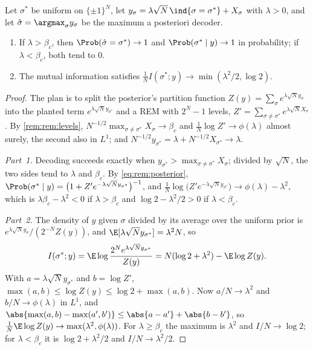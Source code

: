 \begin{refsection}
\begin{corollary}\label{cor:rem:decoding}
Let $\sigma^*$ be uniform on $\{\pm1\}^N$, let $y_\sigma=\lambda\sqrt N\,\ind\{\sigma=\sigma^*\}+X_\sigma$ with $\lambda>0$, and let $\hat\sigma=\argmax_\sigma y_\sigma$ be the maximum a posteriori decoder.
\begin{enumerate}
\item If $\lambda>\beta_c$, then $\Prob(\hat\sigma=\sigma^*)\to1$ and $\Prob(\sigma^*\mid y)\to1$ in probability; if $\lambda<\beta_c$, both tend to $0$.
\item The mutual information satisfies $\frac1N I(\sigma^*;y)\to\min(\lambda^2/2,\log2)$.
\end{enumerate}
\end{corollary}

\begin{proof}
The plan is to split the posterior's partition function $Z(y)=\sum_\sigma e^{\lambda\sqrt Ny_\sigma}$ into the planted term $e^{\lambda\sqrt Ny_{\sigma^*}}$ and a REM with $2^N-1$ levels, $Z'=\sum_{\sigma\ne\sigma^*}e^{\lambda\sqrt NX_\sigma}$. By \cref{rem:rem:levels}, $N^{-1/2}\max_{\sigma\ne\sigma^*}X_\sigma\to\beta_c$ and $\frac1N\log Z'\to\phi(\lambda)$ almost surely, the second also in $L^1$; and $N^{-1/2}y_{\sigma^*}=\lambda+N^{-1/2}X_{\sigma^*}\to\lambda$.

\emph{Part~1.} Decoding succeeds exactly when $y_{\sigma^*}>\max_{\sigma\ne\sigma^*}X_\sigma$; divided by $\sqrt N$, the two sides tend to $\lambda$ and $\beta_c$. By \eqref{eq:rem:posterior}, $\Prob(\sigma^*\mid y)=\bigl(1+Z'e^{-\lambda\sqrt Ny_{\sigma^*}}\bigr)^{-1}$, and $\frac1N\log\bigl(Z'e^{-\lambda\sqrt Ny_{\sigma^*}}\bigr)\to\phi(\lambda)-\lambda^2$, which is $\lambda\beta_c-\lambda^2<0$ if $\lambda>\beta_c$ and $\log2-\lambda^2/2>0$ if $\lambda<\beta_c$.

\emph{Part~2.} The density of $y$ given $\sigma$ divided by its average over the uniform prior is $e^{\lambda\sqrt Ny_\sigma}/(2^{-N}Z(y))$, and $\E[\lambda\sqrt Ny_{\sigma^*}]=\lambda^2N$, so
\[
I(\sigma^*;y)=\E\log\frac{2^Ne^{\lambda\sqrt Ny_{\sigma^*}}}{Z(y)}=N(\log2+\lambda^2)-\E\log Z(y).
\]
With $a=\lambda\sqrt Ny_{\sigma^*}$ and $b=\log Z'$, $\max(a,b)\le\log Z(y)\le\log2+\max(a,b)$. Now $a/N\to\lambda^2$ and $b/N\to\phi(\lambda)$ in $L^1$, and $\abs{\max(a,b)-\max(a',b')}\le\abs{a-a'}+\abs{b-b'}$, so $\frac1N\E\log Z(y)\to\max(\lambda^2,\phi(\lambda))$. For $\lambda\ge\beta_c$ the maximum is $\lambda^2$ and $I/N\to\log2$; for $\lambda<\beta_c$ it is $\log2+\lambda^2/2$ and $I/N\to\lambda^2/2$.
\end{proof}


\end{refsection}
